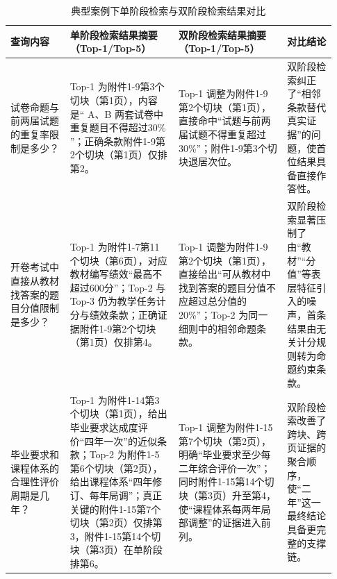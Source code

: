 \begin{table}[htbp]
\centering
\caption{典型案例下单阶段检索与双阶段检索结果对比}
\label{tab:retrieval_case_compare}
\footnotesize
\setlength{\tabcolsep}{4pt}
\renewcommand{\arraystretch}{1.25}
\begin{tabular}{p{0.17\linewidth} p{0.31\linewidth} p{0.31\linewidth} p{0.14\linewidth}}
\hline
查询内容 & 单阶段检索结果摘要（Top-1/Top-5） & 双阶段检索结果摘要（Top-1/Top-5） & 对比结论 \\
\hline
试卷命题与前两届试题的重复率限制是多少？ &
Top-1 为附件1-9第3个切块（第1页），内容是“ A、B 两套试卷中重复题目不得超过30\% ”；正确条款附件1-9第2个切块（第1页）仅排第2。 &
Top-1 调整为附件1-9第2个切块（第1页），直接命中“试题与前两届试题不得重复超过30\%”；附件1-9第3个切块退居次位。 &
双阶段检索纠正了“相邻条款替代真实证据”的问题，使首位结果具备直接作答性。 \\
\hline
开卷考试中直接从教材找答案的题目分值限制是多少？ &
Top-1 为附件1-7第11个切块（第6页），对应教材编写绩效“最高不超过600分”；Top-2 与 Top-3 仍为教学任务计分与绩效条款；正确证据附件1-9第2个切块（第1页）仅排第4。 &
Top-1 调整为附件1-9第2个切块（第1页），直接给出“可从教材中找到答案的题目分值不应超过总分值的20\%”；Top-2 为同一细则中的相邻命题条款。 &
双阶段检索显著压制了由“教材”“分值”等表层特征引入的噪声，首条结果由无关计分规则转为命题约束条款。 \\
\hline
毕业要求和课程体系的合理性评价周期是几年？ &
Top-1 为附件1-14第3个切块（第1页），给出毕业要求达成度评价“四年一次”的近似条款；Top-2 为附件1-5第6个切块（第2页），给出课程体系“四年修订、每年局调”；真正关键的附件1-15第7个切块（第2页）仅排第3，附件1-15第14个切块（第3页）在单阶段排第6。 &
Top-1 调整为附件1-15第7个切块（第2页），明确“毕业要求至少每二年综合评价一次”；同时附件1-15第14个切块（第3页）升至第4，使“课程体系每两年局部调整”的证据进入前列。 &
双阶段检索改善了跨块、跨页证据的聚合顺序，使“二年”这一最终结论具备更完整的支撑链。 \\
\hline
\end{tabular}
\end{table}
